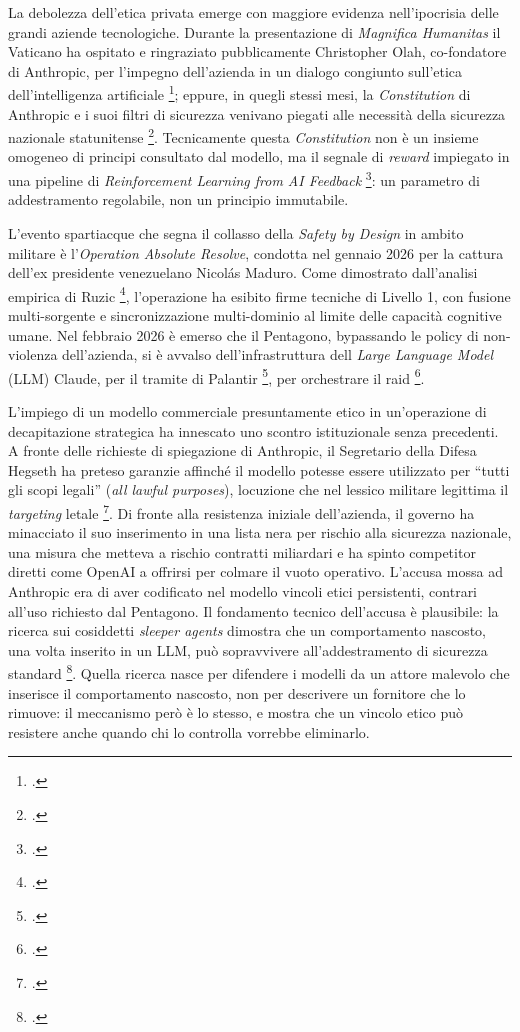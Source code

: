 \documentclass[a4paper,12pt]{report}
\begin{document}
La debolezza dell'etica privata emerge con maggiore evidenza nell'ipocrisia delle
grandi aziende tecnologiche. Durante la presentazione di \textit{Magnifica
Humanitas} il Vaticano ha ospitato e ringraziato pubblicamente Christopher Olah,
co-fondatore di Anthropic, per l'impegno dell'azienda in un dialogo congiunto
sull'etica dell'intelligenza artificiale \footcite{enciclica_2026}; eppure, in
quegli stessi mesi, la \textit{Constitution} di Anthropic e i suoi filtri di
sicurezza venivano piegati alle necessità della sicurezza nazionale statunitense
\footcite{carter_2026}. Tecnicamente questa \textit{Constitution} non è un insieme
omogeneo di principi consultato dal modello, ma il segnale di \textit{reward}
impiegato in una pipeline di \textit{Reinforcement Learning from AI Feedback}
\footcite{bai_2022_cai}: un parametro di addestramento regolabile, non un
principio immutabile.

L'evento spartiacque che segna il collasso della \textit{Safety by Design} in
ambito militare è l'\textit{Operation Absolute Resolve}, condotta nel gennaio 2026
per la cattura dell'ex presidente venezuelano Nicolás Maduro. Come dimostrato
dall'analisi empirica di Ruzic \footcite{ruzic_2026}, l'operazione ha esibito
firme tecniche di Livello 1, con fusione multi-sorgente e sincronizzazione
multi-dominio al limite delle capacità cognitive umane. Nel febbraio 2026 è
emerso che il Pentagono, bypassando le policy di non-violenza dell'azienda, si è
avvalso dell'infrastruttura dell \textit{Large Language Model} (LLM) Claude, per il tramite di Palantir
\footcite{palantir_calumet_2026}, per orchestrare il raid
\footcite{ruzic_2026, carter_2026}.

L'impiego di un modello commerciale presuntamente etico in un'operazione di
decapitazione strategica ha innescato uno scontro istituzionale senza precedenti.
A fronte delle richieste di spiegazione di Anthropic, il Segretario della Difesa
Hegseth ha preteso garanzie affinché il modello potesse essere utilizzato per
``tutti gli scopi legali'' (\textit{all lawful purposes}), locuzione che nel
lessico militare legittima il \textit{targeting} letale \footcite{carter_2026}.
Di fronte alla resistenza iniziale dell'azienda, il governo ha minacciato il suo
inserimento in una lista nera per rischio alla sicurezza nazionale, una misura
che metteva a rischio contratti miliardari e ha spinto competitor diretti come
OpenAI a offrirsi per colmare il vuoto operativo. L'accusa mossa ad Anthropic era di aver codificato nel modello vincoli etici
persistenti, contrari all'uso richiesto dal Pentagono. Il fondamento tecnico
dell'accusa è plausibile: la ricerca sui cosiddetti \textit{sleeper agents}
dimostra che un comportamento nascosto, una volta inserito in un LLM, può
sopravvivere all'addestramento di sicurezza standard \footcite{hubinger_2024_sleeper}.
Quella ricerca nasce per difendere i modelli da un attore malevolo che inserisce
il comportamento nascosto, non per descrivere un fornitore che lo rimuove: il
meccanismo però è lo stesso, e mostra che un vincolo etico può resistere anche
quando chi lo controlla vorrebbe eliminarlo.
\end{document}
